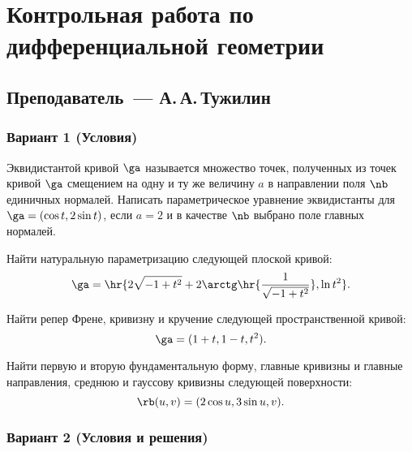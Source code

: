 \documentclass[a4paper]{article}
\begin{document}
\section*{Контрольная работа по дифференциальной геометрии}
\subsection*{Преподаватель~--- А.\,А.\,Тужилин}

\subsubsection*{Вариант 1 (Условия)}

\begin{problem}
Эквидистантой кривой $\ga$ называется множество точек, полученных из точек кривой $\ga$ смещением
на одну и ту же величину $a$ в направлении поля $\nb$ единичных нормалей. Написать параметрическое
уравнение эквидистанты для $\ga = (\cos t, 2\sin t)$, если $a = 2$ и в качестве $\nb$ выбрано поле главных нормалей.
\end{problem}

\begin{problem}
Найти натуральную параметризацию следующей плоской кривой:
$$\ga = \hr{ 2\sqrt{-1+t^2} + 2\arctg\hr{\frac{1}{\sqrt{-1+t^2}}}, \ln t^2}.$$
\end{problem}

\begin{problem}
Найти репер Френе, кривизну и кручение следующей пространственной кривой:
$$\ga = (1 + t, 1- t, t^2).$$
\end{problem}

\begin{problem}
Найти первую и вторую фундаментальную форму, главные кривизны и главные направления,
среднюю и гауссову кривизны следующей поверхности:
$$\rb(u,v) = (2\cos u, 3\sin u, v).$$
\end{problem}

\setcounter{problem}{0}

\subsubsection*{Вариант 2 (Условия и решения)}
\end{document}
